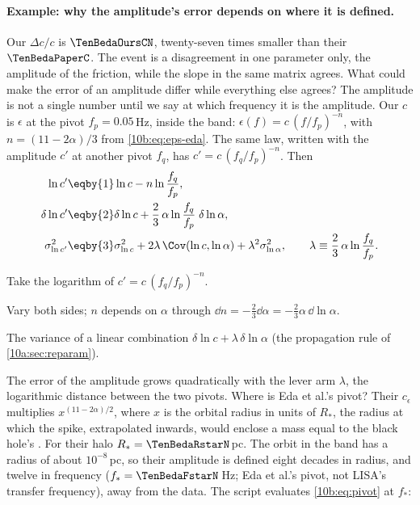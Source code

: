 \paragraph{Example: why the amplitude's error depends on where it is defined.} Our $\Delta c/c$ is
$\TenBedaOursCN$, twenty-seven times smaller than their $\TenBedaPaperC$. The event is a disagreement in one parameter
only, the amplitude of the friction, while the slope in the same matrix agrees. What could make the error of an
amplitude differ while everything else agrees? The amplitude is not a single number until we say at which frequency
it is the amplitude. Our $c$ is $\epsilon$ at the pivot $f_p=0.05$\,Hz, inside the band: $\epsilon(f)=c\,(f/f_p)^{-n}$,
with $n=(11-2\alpha)/3$ from \eqref{10b:eq:eps-eda}. The same law, written with the amplitude $c'$ at another pivot
$f_q$, has $c'=c\,(f_q/f_p)^{-n}$. Then
\begin{align}
  \ln c'&\eqby{1}\ln c-n\ln\frac{f_q}{f_p},\nonumber\\
  \delta\ln c'&\eqby{2}\delta\ln c+\frac23\,\alpha\ln\frac{f_q}{f_p}\;\delta\ln\alpha,\nonumber\\
  \sigma^2_{\ln c'}&\eqby{3}\sigma^2_{\ln c}+2\lambda\,\Cov(\ln c,\ln\alpha)+\lambda^2\sigma^2_{\ln\alpha},
  \qquad\lambda\equiv\frac23\,\alpha\ln\frac{f_q}{f_p}.
  \label{10b:eq:pivot}
\end{align}
\begin{explain}
  \item Take the logarithm of $c'=c\,(f_q/f_p)^{-n}$.
  \item Vary both sides; $n$ depends on $\alpha$ through $\dd n=-\tfrac23\dd\alpha=-\tfrac23\alpha\,\dd\ln\alpha$.
  \item The variance of a linear combination $\delta\ln c+\lambda\,\delta\ln\alpha$ (the propagation rule of
        \cref{10a:sec:reparam}).
\end{explain}
The error of the amplitude grows quadratically with the lever arm $\lambda$, the logarithmic distance between the two
pivots. Where is Eda et al.'s pivot? Their $c_\epsilon$ multiplies $x^{(11-2\alpha)/2}$, where $x$ is the orbital radius
in units of $R_*$, the radius at which the spike, extrapolated inwards, would enclose a mass equal to the black hole's
\cite[eqs.~(10b), (17), (18), (28d)--(28f)]{Eda2015}. For their halo $R_*=\TenBedaRstarN$\,pc. The orbit in the band has
a radius of about $10^{-8}$\,pc, so their amplitude is defined eight decades in radius, and twelve in frequency
($f_*=\TenBedaFstarN$\,Hz; Eda et al.'s pivot, not LISA's transfer frequency), away from the data. The script evaluates \eqref{10b:eq:pivot} at $f_*$:

